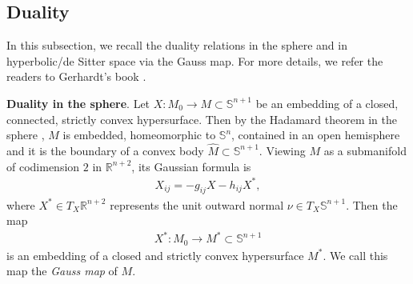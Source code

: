 \documentclass[11pt,reqno]{amsart}
\theoremstyle{definition}
\theoremstyle{remark}
\numberwithin{equation}{section}
\renewcommand{\(}{\left(}
\renewcommand{\)}{\right)}
\renewcommand{\~}{\tilde}
\renewcommand{\-}{\overline}
\newcommand{\ra}{\rightarrow}
\begin{document}
\subsection{Duality}\label{sec:2.2}
In this subsection, we recall the duality relations in the sphere and in hyperbolic/de Sitter space via the Gauss map. For more details, we refer the readers to Gerhardt's book \cite[Chapters 9\&10]{Gerh06}. 

{\bf Duality in the sphere}. 
Let $X:M_0\ra M \subset \mathbb S^{n+1}$ be an embedding of a closed, connected, strictly convex hypersurface. Then by the Hadamard theorem in the sphere \cite{DoCarmo-Warner1970}, $M$ is embedded, homeomorphic to $\mathbb S^n$, contained in an open hemisphere and it is the boundary of a convex body $\hat{M}\subset \mathbb S^{n+1}$. Viewing $M$ as a submanifold of codimension $2$ in $\mathbb R^{n+2}$, its Gaussian formula is
\begin{align*}
X_{ij}=-g_{ij} X-h_{ij}X^\ast,
\end{align*}
where $X^\ast \in T_{X} \mathbb R^{n+2}$ represents the unit outward normal $\nu\in T_X \mathbb S^{n+1}$. Then the map 
\begin{align}\label{s2:Gauss-map}
X^\ast: M_0 \ra M^\ast \subset \mathbb S^{n+1}
\end{align} is an embedding of a closed and strictly convex hypersurface $M^\ast$. We call this map the {\em Gauss map} of $M$.
\end{document}
